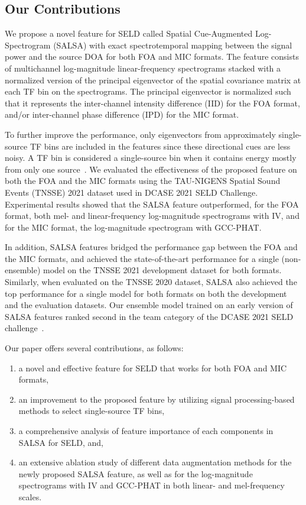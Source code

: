 \documentclass[journal]{IEEEtran}
\newcommand*{\gccphat}{\mbox{GCC-PHAT}\xspace}
\begin{document}
\subsection{Our Contributions}

We propose a novel feature for SELD called Spatial Cue-Augmented Log-Spectrogram (SALSA) with exact spectrotemporal mapping between the signal power and the source DOA for both FOA and MIC formats. The feature consists of multichannel log-magnitude linear-frequency spectrograms stacked with a normalized version of the principal eigenvector of the spatial covariance matrix at each TF bin on the spectrograms. The principal eigenvector is normalized such that it represents the inter-channel intensity difference (IID) for the FOA format, and/or inter-channel phase difference (IPD) for the MIC format. 

To further improve the performance, only eigenvectors from approximately single-source TF bins are included in the features since these directional cues are less noisy. A TF bin is considered a single-source bin when it contains energy mostly from only one source~\cite{Nguyen2014RobustSources, Nguyen2020RobustNetwork}. We evaluated the effectiveness of the proposed feature on both the FOA and the MIC formats using the TAU-NIGENS Spatial Sound Events (TNSSE) 2021 dataset used in DCASE 2021 SELD Challenge. Experimental results showed that the SALSA feature outperformed, for the FOA format, both mel- and linear-frequency log-magnitude spectrograms with IV, and for the MIC format, the log-magnitude spectrogram with \gccphat.

In addition, SALSA features bridged the performance gap between the FOA and the MIC formats, and achieved the state-of-the-art performance for a single (non-ensemble) model on the TNSSE 2021 development dataset for both formats. Similarly, when evaluated on the TNSSE 2020 dataset, SALSA also achieved the top performance for a single model for both formats on both the development and the evaluation datasets. Our ensemble model trained on an early version of SALSA features ranked second in the team category of the DCASE 2021 SELD challenge~\cite{Nguyen2021DCASEDetection}.   

Our paper offers several contributions, as follows:
\begin{enumerate}
    \item a novel and effective feature for SELD that works for both FOA and MIC formats,
    \item an improvement to the proposed feature by utilizing signal processing-based methods to select single-source TF bins,
    \item a comprehensive analysis of feature importance of each components in SALSA for SELD, and,
    \item an extensive ablation study of different data augmentation methods for the newly proposed SALSA feature, as well as for the log-magnitude spectrograms with IV and \gccphat in both linear- and mel-frequency scales.
\end{enumerate}
\end{document}
